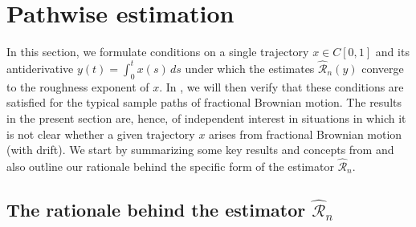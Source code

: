 \documentclass[12pt,reqno]{article}
\DeclarePairedDelimiter\floor{\lfloor}{\rfloor}
\def\wh{\widehat}
\def\wt{\widetilde}
\numberwithin{equation}{section}
\def\cR{{\mathscr R}}
\theoremstyle{definition}
\def\wt#1{\widetilde{#1}}
\def\wh{\widehat}
\def\wt{\widetilde}
\newcommand{\bN}{\mathbb{N}}
\newcommand{\bT}{\mathbb{T}}
\begin{document}
%
%


\section{Pathwise estimation}\label{Section Pathwise}

In this section, we formulate conditions on a single trajectory $x\in C[0,1]$ and its antiderivative $y(t)=\int_0^tx(s)\,ds$ under which the estimates $\wh\cR_n(y)$ converge to the roughness exponent of $x$. In , we will then verify that these conditions are satisfied for the typical sample paths of fractional Brownian motion. The results in the present section are, hence, of independent interest in situations in which it is not clear whether a given trajectory $x$ arises from fractional Brownian motion (with drift).
We start by summarizing some key results and concepts from  \cite{HanSchiedMatrix, HanSchiedHurst} and also outline our rationale behind the specific form of the estimator $\wh\cR_n$.

\subsection{The rationale behind the estimator $\wh\cR_n$}\label{rationale section}
\end{document}
